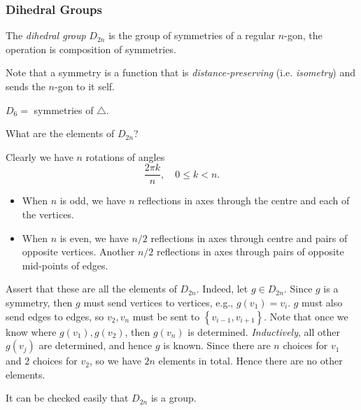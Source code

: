\documentclass[a4paper]{article}
\begin{document}
    \subsubsection{Dihedral Groups}
    \begin{definition}
        The \textit{dihedral group} $ D_{2n} $ is the group of symmetries of a regular $n$-gon, the operation is composition of symmetries.
    \end{definition}
    \begin{remark}
        Note that a symmetry is a function that is \textit{distance-preserving} (i.e. \textit{isometry}) and sends the $n$-gon to it self.
    \end{remark}
    \begin{example}
        $ D_{6}= $ symmetries of $ \triangle $.
    \end{example}
    What are the elements of $ D_{2n} $?

    Clearly we have $n$ rotations of angles
    \[
        \frac{2\pi k}{n}, \quad 0\le k<n
    .\]
    \begin{itemize}
        \item When $n$ is odd, we have $n$ reflections in axes through the centre and each of the vertices.
        \item When $n$ is even, we have $ n/2 $ reflections in axes through centre and pairs of opposite vertices. Another $ n/2 $ reflections in axes through pairs of opposite mid-points of edges.
    \end{itemize}
    Assert that these are all the elements of $ D_{2n} $. Indeed, let $ g\in D_{2n} $. Since $g$ is a symmetry, then $g$ must send vertices to vertices, e.g., $ g(v_1)=v_i $. $g$ must also send edges to edges, so $ v_2,v_n $ must be sent to $ \left\{ v_{i-1},v_{i+1}\right\} $.
    Note that once we know where $g(v_1),g(v_2)$, then $g(v_n)$ is determined. \textit{Inductively}, all other $g(v_j)$ are determined, and hence $g$ is known. Since there are $ n $ choices for $v_1$ and 2 choices for $v_2$, so we have $2n$ elements in total. Hence there are no other elements.

    It can be checked easily that $D_{2n}$ is a group.
\end{document}
